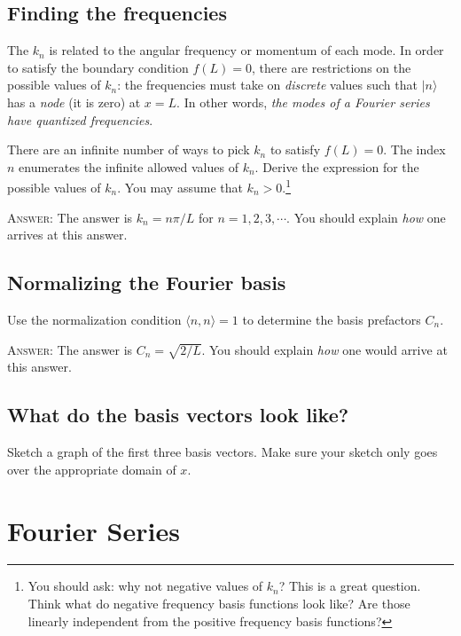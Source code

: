 \documentclass[12pt]{article}
\numberwithin{equation}{section}    %
\begin{document}
\subsection{Finding the frequencies}

The $k_n$ is related to the angular frequency or momentum of each mode. In order to satisfy the boundary condition $f(L) = 0$, there are restrictions on the possible values of $k_n$: the frequencies must take on \emph{discrete} values such that $|n\rangle$ has a \emph{node} (it is zero) at $x=L$. In other words, \emph{the modes of a Fourier series have quantized frequencies}.

There are an infinite number of ways to pick $k_n$ to satisfy $f(L)=0$. The index $n$ enumerates the infinite allowed values of $k_n$. Derive the expression for the possible values of $k_n$. You may assume that $k_n>0$.\footnote{You should ask: why not negative values of $k_n$? This is a great question. Think what do negative frequency basis functions look like? Are those linearly independent from the positive frequency basis functions?}

\textsc{Answer}: The answer is $k_n = n\pi/L$ for $n=1,2,3,\cdots$. You should explain \emph{how} one arrives at this answer.


\subsection{Normalizing the Fourier basis}

Use the normalization condition $\langle n,n\rangle = 1$ to determine the basis prefactors $C_n$.

\textsc{Answer}: The answer is $C_n = \sqrt{2/L}$. You should explain \emph{how} one would arrive at this answer.


\subsection{What do the basis vectors look like?}

Sketch a graph of the first three basis vectors. Make sure your sketch only goes over the appropriate domain of $x$. 

 
\section{Fourier Series}
\end{document}
